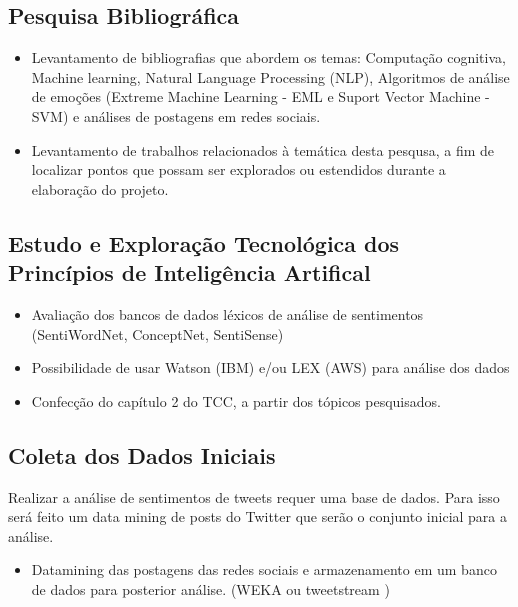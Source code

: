 \documentclass[
	12pt,				%
	openright,			%
	oneside,			%
	a4paper,			%
	english,			%
	spanish,			%
	brazil				%
	]{abntex2}
\begin{document}
		
		\subsection*{Pesquisa Bibliográfica}
		
				\begin{itemize}
					\item Levantamento de bibliografias que abordem os temas: Computação cognitiva, Machine learning, Natural Language Processing (NLP), Algoritmos de análise de emoções (Extreme Machine Learning - EML e Suport Vector Machine - SVM) e análises de postagens em redes sociais.
					\item Levantamento de trabalhos relacionados à temática desta pesqusa, a fim de localizar pontos que possam ser explorados ou estendidos durante a elaboração do projeto.
					
				\end{itemize}
				
		\subsection*{Estudo e Exploração Tecnológica dos Princípios de Inteligência Artifical }
				
				\begin{itemize} 
					\item Avaliação dos bancos de dados léxicos de análise de sentimentos (SentiWordNet, ConceptNet, SentiSense)
					\item Possibilidade de usar Watson (IBM) e/ou LEX (AWS) para análise dos dados
					\item Confecção do capítulo 2 do TCC, a partir dos tópicos pesquisados.
				\end{itemize}			
				
		\subsection*{Coleta dos Dados Iniciais}
		Realizar a análise de sentimentos de tweets requer uma base de dados. Para isso será feito um data mining de posts do Twitter que serão o conjunto inicial para a análise.
		 
				\begin{itemize}
					\item Datamining das postagens das redes sociais e armazenamento em um banco de dados para posterior análise. (WEKA \cite{article_weka} ou tweetstream \cite{tweetstream})
				\end{itemize}
				
\end{document}
